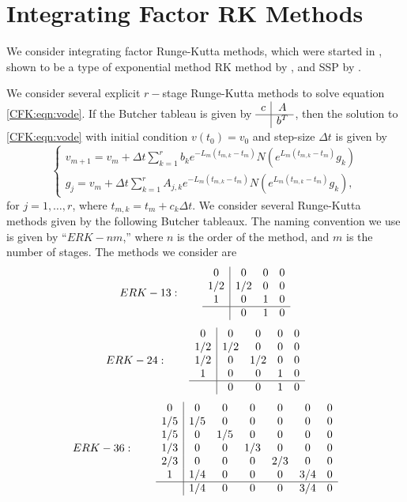 \documentclass{csri19}
\begin{document}
\section{Integrating Factor RK Methods}\label{CFK:sec:implementation}
We consider integrating factor Runge-Kutta methods, which were started in 
\cite{CFK:Lawson1969}, shown to be a type of exponential method RK method by
\cite{CFK:Minchev2006}, and SSP by \cite{CFK:Isherwood2018}.

We consider several explicit $r-$stage Runge-Kutta methods to solve equation
\ref{CFK:eqn:vode}. If the Butcher tableau is given by $\begin{array}{c|c}
c & A \\ \hline & b^T \end{array}$, then the solution to \ref{CFK:eqn:vode} with
initial condition $v(t_0) = v_0$ and step-size $\Delta t$ is given by
\[ \left\{\begin{array}{l} v_{m+1} = v_m + \Delta t\sum_{k=1}^r b_k 
                         e^{-L_m(t_{m,k}-t_m)}N(e^{L_m(t_{m,k}-t_m)}g_k) \\
          g_j = v_m + \Delta t \sum_{k=1}^r A_{j,k} e^{-L_m(t_{m,k} - t_m)} 
                      N(e^{L_m(t_{m,k}-t_m)}g_k), \end{array} \right. \]
for $j = 1,\dots,r$, where $t_{m,k} = t_m + c_k \Delta t$.
We consider several Runge-Kutta methods given by the
following Butcher tableaux. The naming convention we use is given by ``$ERK
-nm$,'' where $n$ is the order of the method, and $m$ is the number of
stages. The methods we consider are
\[ ERK-13: \qquad
 \begin{array}{c|ccc}
0   & 0   & 0 & 0\\
1/2 & 1/2 & 0 & 0\\
1   & 0   & 1 & 0\\
\hline
    & 0   & 1 & 0
\end{array}\]
\[ ERK-24: \qquad
\begin{array}{c|cccc}
0   & 0   & 0   & 0 & 0\\
1/2 & 1/2 & 0   & 0 & 0\\
1/2 & 0   & 1/2 & 0 & 0\\
1   & 0   & 0   & 1 & 0\\
\hline
    & 0   & 0   & 1 & 0
\end{array}\]
\[ ERK-36: \qquad
\begin{array}{c|cccccc}
0   & 0   & 0   & 0   & 0   & 0   & 0\\
1/5 & 1/5 & 0   & 0   & 0   & 0   & 0\\
1/5 & 0   & 1/5 & 0   & 0   & 0   & 0\\
1/3 & 0   & 0   & 1/3 & 0   & 0   & 0\\
2/3 & 0   & 0   & 0   & 2/3 & 0   & 0\\
1   & 1/4 & 0   & 0   & 0   & 3/4 & 0\\
\hline
    & 1/4 & 0   & 0   & 0   & 3/4 & 0
\end{array}\]
\end{document}
